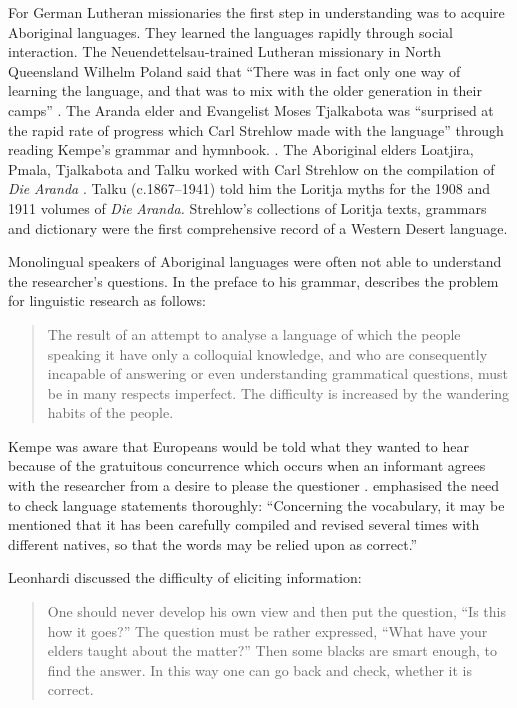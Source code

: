 \documentclass[output=paper]{langsci/langscibook}
\begin{document}
For German Lutheran missionaries the first step in understanding was to acquire Aboriginal languages. They learned the languages rapidly through social interaction. The Neuendettelsau-trained Lutheran missionary in North Queensland Wilhelm Poland said that “There was in fact only one way of learning the language, and that was to mix with the older generation in their camps” \citep[103]{poland_loose_1988}. The Aranda elder and Evangelist Moses Tjalkabota was “surprised at the rapid rate of progress which Carl Strehlow made with the language” through reading Kempe’s grammar and hymnbook. \citep[65--66]{latz_blind_2014}. The Aboriginal elders Loatjira, Pmala, Tjalkabota and Talku worked with Carl Strehlow on the compilation of \textit{Die} \textit{Aranda} \citep[29]{kenny_arandas_2013}. Talku (c.1867–1941) told him the Loritja myths for the 1908 and 1911 volumes of \textit{Die} \textit{Aranda.} Strehlow’s collections of Loritja texts, grammars and dictionary were the first comprehensive record of a Western Desert language.

Monolingual speakers of Aboriginal languages were often not able to understand the researcher’s questions. In the preface to his grammar, \citet[1]{kempe_grammar_1891} describes the problem for linguistic research as follows: 

\begin{quote}
    The result of an attempt to analyse a language of which the people speaking it have only a colloquial knowledge, and who are consequently incapable of answering or even understanding grammatical questions, must be in many respects imperfect. The difficulty is increased by the wandering habits of the people. 
\end{quote}

Kempe was aware that Europeans would be told what they wanted to hear because of the gratuitous concurrence which occurs when an informant agrees with the researcher from a desire to please the questioner \citep[198]{liberman_understanding_1985}. \citet[1]{kempe_grammar_1891} emphasised the need to check language statements thoroughly: “Concerning the vocabulary, it may be mentioned that it has been carefully compiled and revised several times with different natives, so that the words may be relied upon as correct.” 

Leonhardi discussed the difficulty of eliciting information:

\begin{quote}
    One should never develop his own view and then put the question, “Is this how it goes?” The question must be rather expressed, “What have your elders taught about the matter?” Then some blacks are smart enough, to find the answer. In this way one can go back and check, whether it is correct. \citep[286]{leonhardi_uber_1907}
\end{quote}
\end{document}
